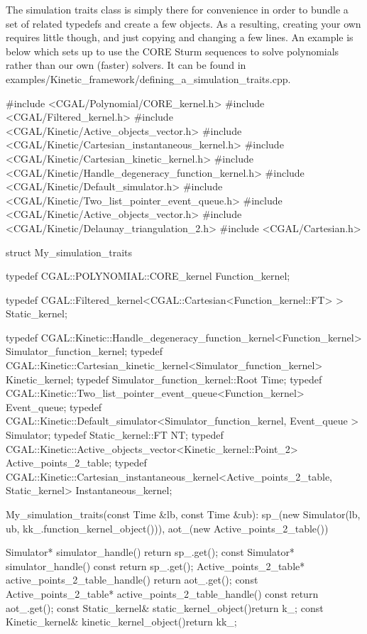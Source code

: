 \ccExample

The simulation traits class is simply there for convenience in order to bundle a set of related typedefs and create a few objects. As a resulting, creating your own requires little though, and just copying and changing a few lines. An example is below which sets up to use the CORE Sturm sequences to solve polynomials rather than our own (faster) solvers. It can be found in examples/Kinetic\_framework/defining\_a\_simulation\_traits.cpp.

\begin{ccExampleCode}
#include <CGAL/Polynomial/CORE_kernel.h>
#include <CGAL/Filtered_kernel.h>
#include <CGAL/Kinetic/Active_objects_vector.h>
#include <CGAL/Kinetic/Cartesian_instantaneous_kernel.h>
#include <CGAL/Kinetic/Cartesian_kinetic_kernel.h>
#include <CGAL/Kinetic/Handle_degeneracy_function_kernel.h>
#include <CGAL/Kinetic/Default_simulator.h>
#include <CGAL/Kinetic/Two_list_pointer_event_queue.h>
#include <CGAL/Kinetic/Active_objects_vector.h>
#include <CGAL/Kinetic/Delaunay_triangulation_2.h>
#include <CGAL/Cartesian.h>



struct My_simulation_traits {
  typedef CGAL::POLYNOMIAL::CORE_kernel Function_kernel;

  typedef CGAL::Filtered_kernel<CGAL::Cartesian<Function_kernel::FT> > Static_kernel;

  typedef CGAL::Kinetic::Handle_degeneracy_function_kernel<Function_kernel>  Simulator_function_kernel;
  typedef CGAL::Kinetic::Cartesian_kinetic_kernel<Simulator_function_kernel> Kinetic_kernel;
  typedef Simulator_function_kernel::Root Time;
  typedef CGAL::Kinetic::Two_list_pointer_event_queue<Function_kernel> Event_queue;
  typedef CGAL::Kinetic::Default_simulator<Simulator_function_kernel, Event_queue > Simulator;
  typedef Static_kernel::FT NT;
  typedef CGAL::Kinetic::Active_objects_vector<Kinetic_kernel::Point_2> Active_points_2_table;
  typedef CGAL::Kinetic::Cartesian_instantaneous_kernel<Active_points_2_table, Static_kernel>  Instantaneous_kernel;

  My_simulation_traits(const Time &lb, const Time &ub): sp_(new Simulator(lb, ub, kk_.function_kernel_object())),
    aot_(new Active_points_2_table()){
  }

  Simulator* simulator_handle(){ return sp_.get();}
  const Simulator* simulator_handle() const { return sp_.get();}
  Active_points_2_table* active_points_2_table_handle(){ return aot_.get();}
  const Active_points_2_table* active_points_2_table_handle() const { return aot_.get();}
  const Static_kernel& static_kernel_object(){return k_;}
  const Kinetic_kernel& kinetic_kernel_object(){return kk_;}

}
\end{ccExampleCode}
